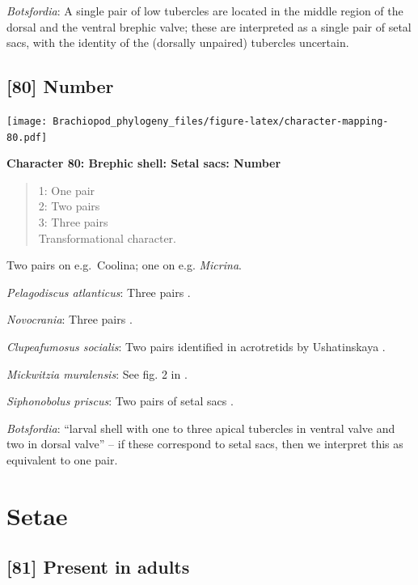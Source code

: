 \documentclass[]{book}
\theoremstyle{definition}
\theoremstyle{definition}
\theoremstyle{definition}
\theoremstyle{remark}
\begin{document}
\emph{Botsfordia}: A single pair of low tubercles are \citep[ state
``may be'']{Ushatinskaya2016Revisionof} located in the middle region of
the dorsal and the ventral brephic valve; these are interpreted as a
single pair of setal sacs, with the identity of the (dorsally unpaired)
tubercles uncertain.

\hypertarget{number}{%
\subsection*{{[}80{]} Number}\label{number}}

\texttt{[image: Brachiopod\_phylogeny\_files/figure-latex/character-mapping-80.pdf]}

\textbf{Character 80: Brephic shell: Setal sacs: Number}

\begin{quote}
1: One pair\\
2: Two pairs\\
3: Three pairs\\
Transformational character.
\end{quote}

Two pairs on e.g.~Coolina; one on e.g. \emph{Micrina}.

\emph{Pelagodiscus atlanticus}: Three pairs
\citep{Carlson1995Phylogeneticrelationships}.

\emph{Novocrania}: Three pairs
\citep{Carlson1995Phylogeneticrelationships}.

\emph{Clupeafumosus socialis}: Two pairs identified in acrotretids by
Ushatinskaya \citeyearpar{Ushatinskaya2016Protegulumand}.

\emph{Mickwitzia muralensis}: See fig. 2 in
\citet{Balthasar2009Thebrachiopod}.

\emph{Siphonobolus priscus}: Two pairs of setal sacs
\citep{Popov2009Earlyontogeny}.

\emph{Botsfordia}: ``larval shell with one to three apical tubercles in
ventral valve and two in dorsal valve''
\citep{Williams2000BrachiopodaLinguliformea} -- if these correspond to
setal sacs, then we interpret this as equivalent to one pair.

\hypertarget{setae}{%
\section{Setae}\label{setae}}

\hypertarget{present-in-adults}{%
\subsection*{{[}81{]} Present in adults}\label{present-in-adults}}
\end{document}
